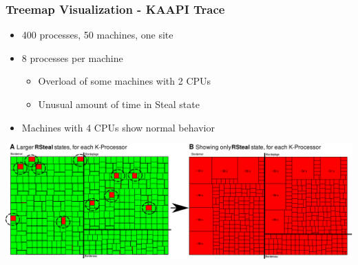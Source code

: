 %
%


\frame
{
   \frametitle{Treemap Visualization - KAAPI Trace}

   \begin{itemize}
   \item 400 processes, 50 machines, one site
   \item 8 processes per machine
      \begin{itemize}
      \item Overload of some machines with 2 CPUs
      \item Unusual amount of time in Steal state
      \end{itemize}
   \item Machines with 4 CPUs show normal behavior
   \end{itemize}

   \vfill
   \includegraphics[width=\textwidth]{img/kaapi-scenario-b.pdf}
}

